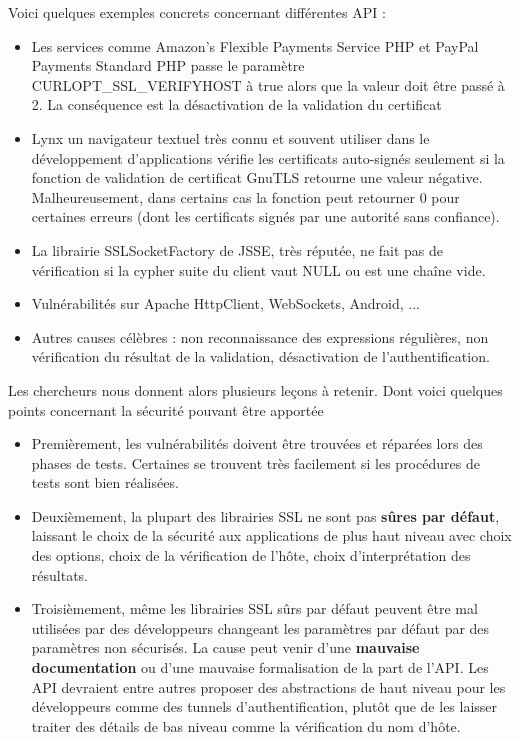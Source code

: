 \documentclass{article}
\begin{document}
	Voici quelques exemples concrets concernant différentes API : 
	\begin{itemize}
	\item Les services comme Amazon's Flexible Payments Service PHP 
	et PayPal Payments Standard PHP passe le paramètre
	CURLOPT_SSL_VERIFYHOST à true alors que la valeur doit être passé à 2.
	La conséquence est la désactivation de la validation du certificat
	
	\item Lynx un navigateur textuel très connu et souvent utiliser dans
	le développement d'applications vérifie les certificats auto-signés
	seulement si la fonction de validation de certificat GnuTLS retourne
	une valeur négative. Malheureusement, dans certains cas la fonction
	peut retourner 0 pour certaines erreurs (dont les certificats signés
	par une autorité sans confiance).
	
	\item La librairie SSLSocketFactory de JSSE, très réputée, ne fait pas
	de vérification si la cypher suite du client vaut NULL ou est une 
	chaîne vide.
	
	\item Vulnérabilités sur Apache HttpClient, WebSockets, Android, ...
	
	\item Autres causes célèbres : non reconnaissance des expressions
	régulières, non vérification du résultat de la validation, 
	désactivation de l'authentification.\\
	\end{itemize}
	
	Les chercheurs nous donnent alors plusieurs leçons à retenir.
	Dont voici quelques points concernant la sécurité pouvant être
	apportée\\
	\begin{itemize}
	\item Premièrement, les vulnérabilités doivent être trouvées
	et réparées lors des phases de tests. Certaines se trouvent 
	très facilement si les procédures de tests sont bien réalisées.
	\item Deuxièmement, la plupart des librairies SSL ne sont pas
	\textbf{sûres par défaut}, laissant le choix de la sécurité aux 
	applications de plus haut niveau avec choix des options,
	choix de la vérification de l'hôte, choix d'interprétation
	des résultats.
	\item Troisièmement, même les librairies SSL sûrs par défaut
	peuvent être mal utilisées par des développeurs changeant les
	paramètres par défaut par des paramètres non sécurisés. La 
	cause peut venir d'une \textbf{mauvaise documentation} 
	ou d'une mauvaise formalisation de la part de l'API. 
	Les API devraient entre autres proposer des abstractions de 
	haut niveau pour les développeurs comme des tunnels
	d'authentification, plutôt que de les laisser traiter 
	des détails de bas niveau comme la vérification du nom d'hôte.\\
	\end{itemize}
	
\end{document}
